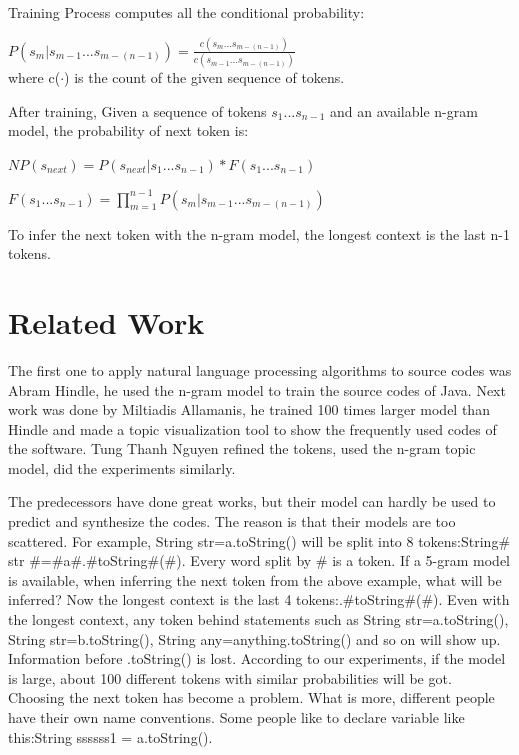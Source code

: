 \documentclass{sig-alternate-05-2015}
\begin{document}
Training Process computes all the conditional probability:

$P(s_m|s_{m-1}...s_{m-(n-1)}) = \frac{c(s_m...s_{m-(n-1)})}{c(s_{m-1}...s_{m-(n-1)})}$
\\where c($\cdot$) is the count of the given sequence of tokens.

After training, Given a sequence of tokens $s_1...s_{n-1}$ and an available n-gram model, the probability of next token is:

$NP(s_{next}) = P(s_{next}|s_1...s_{n-1}) * F(s_1...s_{n-1})$

$F(s_1...s_{n-1}) = \prod_{m=1}^{n-1}P(s_m|s_{m-1}...s_{m-(n-1)})$

To infer the next token with the n-gram model, the longest context is the last n-1 tokens.

\vspace{-0.1cm}
\section{Related Work}

The first one to apply natural language processing algorithms to source codes was Abram Hindle\cite{DBLP:conf/icse/HindleBSGD12}, he used the n-gram\cite{cavnar1994n} model to train the source codes of Java. Next work was done by Miltiadis Allamanis\cite{DBLP:conf/msr/AllamanisS13a}, he trained 100 times larger model than Hindle and made a topic visualization tool to show the frequently used codes of the software. Tung Thanh Nguyen\cite{DBLP:conf/sigsoft/NguyenNNN13} refined the tokens, used the n-gram topic\cite{wang2007topical} model, did the experiments similarly.

The predecessors have done great works, but their model can hardly be used to predict and synthesize the codes. The reason is that their models are too scattered. For example, String str=a.toString() will be split into 8 tokens:String$\#$str
$\#$=$\#$a$\#$.$\#$toString$\#$($\#$). Every word split by $\#$ is a token. If a 5-gram model is available, when inferring the next token from the above example, what will be inferred? Now the longest context is the last 4 tokens:.$\#$toString$\#$($\#$). Even with the longest context, any token behind statements such as String str=a.toString(), String str=b.toString(), String any=anything.toString() and so on will show up. Information before .toString() is lost. According to our experiments, if the model is large, about 100 different tokens with similar probabilities will be got. Choosing the next token has become a problem. What is more, different people have their own name conventions. Some people like to declare variable like this:String ssssss1 = a.toString().
\end{document}
